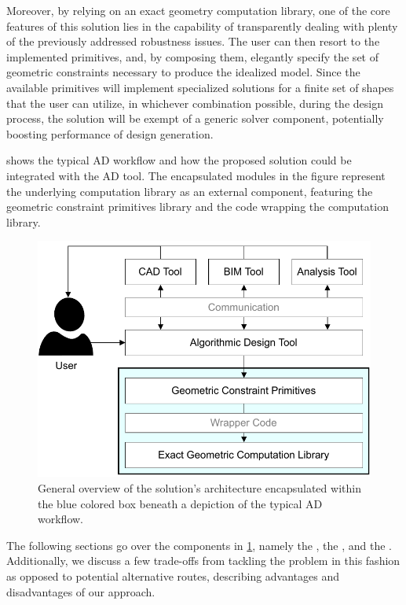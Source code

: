 Moreover, by relying on an exact geometry computation library, one of the core
features of this solution lies in the capability of transparently dealing with
plenty of the previously addressed robustness issues.  The user can then resort
to the implemented primitives, and, by composing them, elegantly specify the set
of geometric constraints necessary to produce the idealized model.  Since the
available primitives will implement specialized solutions for a finite set of
shapes that the user can utilize, in whichever combination possible, during the
design process, the solution will be exempt of a generic solver component,
potentially boosting performance of design generation.

 shows the typical \ac{AD} workflow and how the proposed
solution could be integrated with the \ac{AD} tool.  The encapsulated modules in
the figure represent the underlying computation library as an external
component, featuring the geometric constraint primitives library and the code
wrapping the computation library.

\begin{figure}[htb]
  \includegraphics[width=\textwidth]{fig/solution-arch}
  \caption[Solution architecture within AD workflow]{
    General overview of the solution's architecture encapsulated within the
    blue colored box beneath a depiction of the typical \ac{AD} workflow.}%
  \label{fig:solution.arch}
\end{figure}

The following sections go over the components in \cref{fig:solution.arch},
namely the \geomlibrary{}, the \wrapper{}, and the \primitives{}.  Additionally,
we discuss a few trade-offs from tackling the problem in this fashion as opposed
to potential alternative routes, describing advantages and disadvantages of our
approach.



